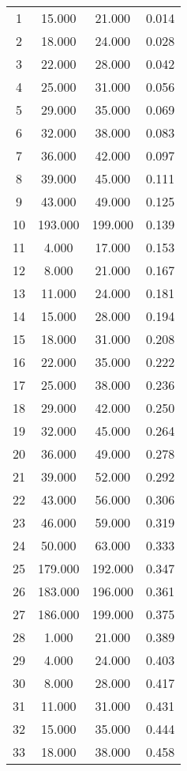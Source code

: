 % 
\begin{tabular}{cccc}
  \hline
  \hline
1 & 15.000 & 21.000 & 0.014 \\ 
  2 & 18.000 & 24.000 & 0.028 \\ 
  3 & 22.000 & 28.000 & 0.042 \\ 
  4 & 25.000 & 31.000 & 0.056 \\ 
  5 & 29.000 & 35.000 & 0.069 \\ 
  6 & 32.000 & 38.000 & 0.083 \\ 
  7 & 36.000 & 42.000 & 0.097 \\ 
  8 & 39.000 & 45.000 & 0.111 \\ 
  9 & 43.000 & 49.000 & 0.125 \\ 
  10 & 193.000 & 199.000 & 0.139 \\ 
  11 & 4.000 & 17.000 & 0.153 \\ 
  12 & 8.000 & 21.000 & 0.167 \\ 
  13 & 11.000 & 24.000 & 0.181 \\ 
  14 & 15.000 & 28.000 & 0.194 \\ 
  15 & 18.000 & 31.000 & 0.208 \\ 
  16 & 22.000 & 35.000 & 0.222 \\ 
  17 & 25.000 & 38.000 & 0.236 \\ 
  18 & 29.000 & 42.000 & 0.250 \\ 
  19 & 32.000 & 45.000 & 0.264 \\ 
  20 & 36.000 & 49.000 & 0.278 \\ 
  21 & 39.000 & 52.000 & 0.292 \\ 
  22 & 43.000 & 56.000 & 0.306 \\ 
  23 & 46.000 & 59.000 & 0.319 \\ 
  24 & 50.000 & 63.000 & 0.333 \\ 
  25 & 179.000 & 192.000 & 0.347 \\ 
  26 & 183.000 & 196.000 & 0.361 \\ 
  27 & 186.000 & 199.000 & 0.375 \\ 
  28 & 1.000 & 21.000 & 0.389 \\ 
  29 & 4.000 & 24.000 & 0.403 \\ 
  30 & 8.000 & 28.000 & 0.417 \\ 
  31 & 11.000 & 31.000 & 0.431 \\ 
  32 & 15.000 & 35.000 & 0.444 \\ 
  33 & 18.000 & 38.000 & 0.458 \\ 

\end{tabular}
